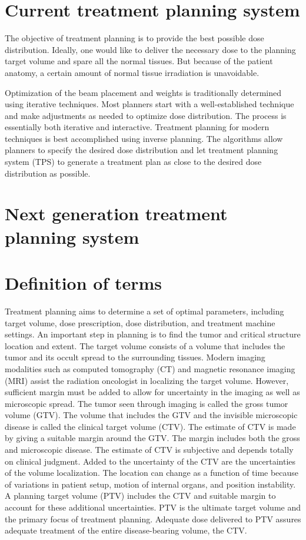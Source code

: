 \section{Current treatment planning system}
The objective of treatment planning is to provide the best possible dose distribution. Ideally, one would like to deliver the necessary dose to the planning target volume and spare all the normal tissues. But because of the patient anatomy, a certain amount of normal tissue irradiation is unavoidable.  

Optimization of the beam placement and weights is traditionally determined using iterative techniques. Most planners start with a well-established technique and make adjustments as needed to optimize dose distribution. The process is essentially both iterative and interactive. Treatment planning for modern techniques is best accomplished using inverse planning. The algorithms allow planners to specify the desired dose distribution and let treatment planning system (TPS) to generate a treatment plan as close to the desired dose distribution as possible. 


\section{Next generation treatment planning system}

\section{Definition of terms}
Treatment planning aims to determine a set of optimal parameters, including target volume, dose prescription, dose distribution, and treatment machine settings. An important step in planning is to find the tumor and critical structure location and extent. The target volume consists of a volume that includes the tumor and its occult spread to the surrounding tissues. Modern imaging modalities such as computed tomography (CT) and magnetic resonance imaging (MRI) assist the radiation oncologist in localizing the target volume. However, sufficient margin must be added to allow for uncertainty in the imaging as well as microscopic spread. The tumor seen through imaging is called the gross tumor volume (GTV). The volume that includes the GTV and the invisible microscopic disease is called the clinical target volume (CTV). The estimate of CTV is made by giving a suitable margin around the GTV. The margin includes both the gross and microscopic disease. The estimate of CTV is subjective and depends totally on clinical judgment. Added to the uncertainty of the CTV are the uncertainties of the volume localization. The location can change as a function of time because of variations in patient setup, motion of internal organs, and position instability. A planning target volume (PTV) includes the CTV and suitable margin to account for these additional uncertainties. PTV is the ultimate target volume and the primary focus of treatment planning. Adequate dose delivered to PTV assures adequate treatment of the entire disease-bearing volume, the CTV.

